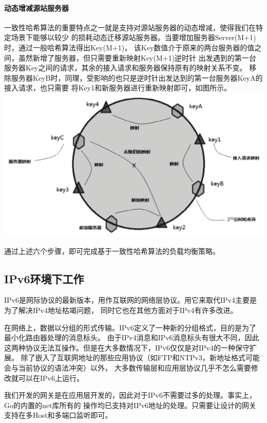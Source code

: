 \documentclass[twoside]{CUGThesis}
\begin{document}
	\paragraph{动态增减源站服务器}
	一致性哈希算法的重要特点之一就是支持对源站服务器的动态增减，使得我们在特定场景下能够以较少
	的损耗动态迁移源站服务器。当要增加服务器Server(M+1)时，通过一般哈希算法得出Key(M+1)，
	该Key数值介于原来的两台服务器的值之间，虽然新增了服务器，但只需要重新映射Key(M+1)逆时针
	出发遇到的第一台服务器Key之间的请求，其余的接入请求和服务器保持原有的映射关系不变。
	移除服务器KeyB时，同理，受影响的也只是逆时针出发达到的第一台服务器KeyA的接入请求，也只需要
	将Key1和新服务器进行重新映射即可，如图所示。\\
	\includegraphics[scale=0.36]{Figures/hash_circle.jpg}

	\par 
	通过上述六个步骤，即可完成基于一致性哈希算法的负载均衡策略。

	\subsection{IPv6环境下工作}
	IPv6是网际协议的最新版本，用作互联网的网络层协议。用它来取代IPv4主要是为了解决IPv4地址枯竭问题，
	同时它也在其他方面对于IPv4有许多改进。 \par 
	在网络上，数据以分组的形式传输。IPv6定义了一种新的分组格式，目的是为了最小化路由器处理的消息标头。
	由于IPv4消息和IPv6消息标头有很大不同，因此这两种协议无法互操作。但是在大多数情况下，IPv6仅仅是对IPv4的一种保守扩展。
	除了嵌入了互联网地址的那些应用协议（如FTP和NTPv3，新地址格式可能会与当前协议的语法冲突）以外，
	大多数传输层和应用层协议几乎不怎么需要修改就可以在IPv6上运行\cite{伍佑明2009ipv6}。 \par 
	我们开发的网关是在应用层开发的，因此对于IPv6不需要过多的处理。事实上，Go的内置的net库所有的
	操作均已支持对IPv6地址的处理。只需要让设计的网关支持在多Host和多端口监听即可。
\end{document}
